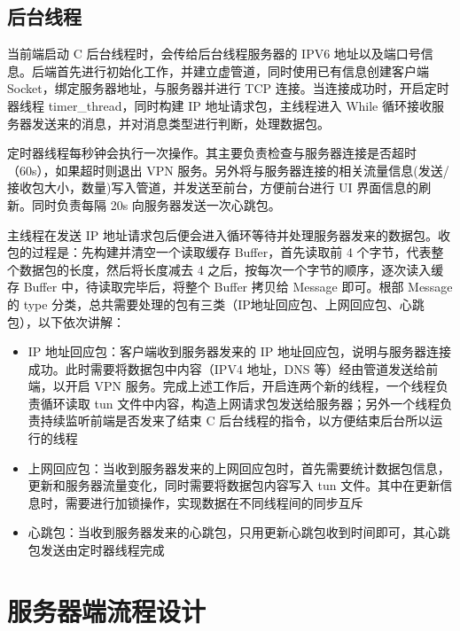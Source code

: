 \subsection{后台线程}
当前端启动 C 后台线程时，会传给后台线程服务器的 IPV6 地址以及端口号信息。后端首先进行初始化工作，并建立虚管道，同时使用已有信息创建客户端 Socket，绑定服务器地址，与服务器并进行 TCP 连接。当连接成功时，开启定时器线程 timer\_thread，同时构建 IP 地址请求包，主线程进入 While 循环接收服务器发送来的消息，并对消息类型进行判断，处理数据包。

定时器线程每秒钟会执行一次操作。其主要负责检查与服务器连接是否超时（60s），如果超时则退出 VPN 服务。另外将与服务器连接的相关流量信息(发送/接收包大小，数量)写入管道，并发送至前台，方便前台进行 UI 界面信息的刷新。同时负责每隔 20s 向服务器发送一次心跳包。

主线程在发送 IP 地址请求包后便会进入循环等待并处理服务器发来的数据包。收包的过程是：先构建并清空一个读取缓存 Buffer，首先读取前 4 个字节，代表整个数据包的长度，然后将长度减去 4 之后，按每次一个字节的顺序，逐次读入缓存 Buffer 中，待读取完毕后，将整个 Buffer 拷贝给 Message 即可。根部 Message 的 type 分类，总共需要处理的包有三类（IP地址回应包、上网回应包、心跳包），以下依次讲解：

\begin{itemize}
  \item IP 地址回应包：客户端收到服务器发来的 IP 地址回应包，说明与服务器连接成功。此时需要将数据包中内容（IPV4 地址，DNS 等）经由管道发送给前端，以开启 VPN 服务。完成上述工作后，开启连两个新的线程，一个线程负责循环读取 tun 文件中内容，构造上网请求包发送给服务器；另外一个线程负责持续监听前端是否发来了结束 C 后台线程的指令，以方便结束后台所以运行的线程
  \item 上网回应包：当收到服务器发来的上网回应包时，首先需要统计数据包信息，更新和服务器流量变化，同时需要将数据包内容写入 tun 文件。其中在更新信息时，需要进行加锁操作，实现数据在不同线程间的同步互斥
  \item 心跳包：当收到服务器发来的心跳包，只用更新心跳包收到时间即可，其心跳包发送由定时器线程完成
\end{itemize}

\section{服务器端流程设计}

